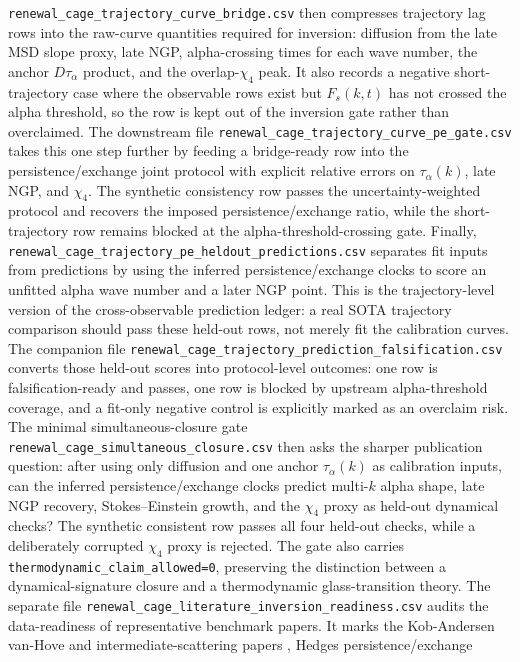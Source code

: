 \documentclass[aps,preprint,onecolumn,superscriptaddress,nofootinbib]{revtex4-2}
\begin{document}
\texttt{renewal\_cage\_trajectory\_curve\_bridge.csv} then compresses
trajectory lag rows into the raw-curve quantities required for inversion:
diffusion from the late MSD slope proxy, late NGP, alpha-crossing times for
each wave number, the anchor $D\tau_\alpha$ product, and the overlap-$\chi_4$
peak. It also records a negative short-trajectory case where the observable
rows exist but $F_s(k,t)$ has not crossed the alpha threshold, so the row is
kept out of the inversion gate rather than overclaimed.
The downstream file
\texttt{renewal\_cage\_trajectory\_curve\_pe\_gate.csv} takes this one step
further by feeding a bridge-ready row into the persistence/exchange joint
protocol with explicit relative errors on $\tau_\alpha(k)$, late NGP, and
$\chi_4$. The synthetic consistency row passes the uncertainty-weighted
protocol and recovers the imposed persistence/exchange ratio, while the
short-trajectory row remains blocked at the alpha-threshold-crossing gate.
Finally,
\texttt{renewal\_cage\_trajectory\_pe\_heldout\_predictions.csv} separates
fit inputs from predictions by using the inferred persistence/exchange clocks
to score an unfitted alpha wave number and a later NGP point. This is the
trajectory-level version of the cross-observable prediction ledger: a real
SOTA trajectory comparison should pass these held-out rows, not merely fit the
calibration curves.
The companion file
\texttt{renewal\_cage\_trajectory\_prediction\_falsification.csv} converts
those held-out scores into protocol-level outcomes: one row is
falsification-ready and passes, one row is blocked by upstream alpha-threshold
coverage, and a fit-only negative control is explicitly marked as an overclaim
risk.
The minimal simultaneous-closure gate
\texttt{renewal\_cage\_simultaneous\_closure.csv} then asks the sharper
publication question: after using only diffusion and one anchor
$\tau_\alpha(k)$ as calibration inputs, can the inferred persistence/exchange
clocks predict multi-$k$ alpha shape, late NGP recovery, Stokes--Einstein
growth, and the $\chi_4$ proxy as held-out dynamical checks? The synthetic
consistent row passes all four held-out checks, while a deliberately corrupted
$\chi_4$ proxy is rejected. The gate also carries
\texttt{thermodynamic\_claim\_allowed=0}, preserving the distinction between a
dynamical-signature closure and a thermodynamic glass-transition theory.
The separate file
\texttt{renewal\_cage\_literature\_inversion\_readiness.csv} audits the
data-readiness of representative benchmark papers. It marks the
Kob-Andersen van-Hove and intermediate-scattering papers
\cite{kob1995vanhove,kob1995intermediate}, Hedges persistence/exchange
\end{document}
